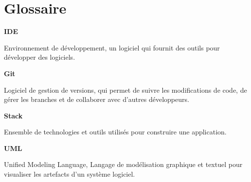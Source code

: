 \chapter*{Glossaire}

\begin{minipage}{\textwidth}
    \begin{minipage}{0.1\textwidth}
        \textbf{IDE}
    \end{minipage}\hfill
    \begin{minipage}{0.8\textwidth}
        Environnement de développement, un logiciel qui fournit des outils pour développer des logiciels.
    \end{minipage}
\end{minipage}

\vspace{1cm}

\begin{minipage}{\textwidth}
    \begin{minipage}{0.1\textwidth}
        \textbf{Git}
    \end{minipage}\hfill
    \begin{minipage}{0.8\textwidth}
        Logiciel de gestion de versions, qui permet de suivre les modifications de code, de gérer les branches et de collaborer avec d'autres développeurs.
    \end{minipage}
\end{minipage}

\vspace{1cm}

\begin{minipage}{\textwidth}
    \begin{minipage}{0.1\textwidth}
        \textbf{Stack}
    \end{minipage}\hfill
    \begin{minipage}{0.8\textwidth}
        Ensemble de technologies et outils utilisés pour construire une application.
    \end{minipage}
\end{minipage}

\vspace{1cm}

\begin{minipage}{\textwidth}
    \begin{minipage}{0.1\textwidth}
        \textbf{UML}
    \end{minipage}\hfill
    \begin{minipage}{0.8\textwidth}
        Unified Modeling Language, Langage de modélisation graphique et textuel pour visualiser les artefacts d’un système logiciel.
    \end{minipage}
\end{minipage}

